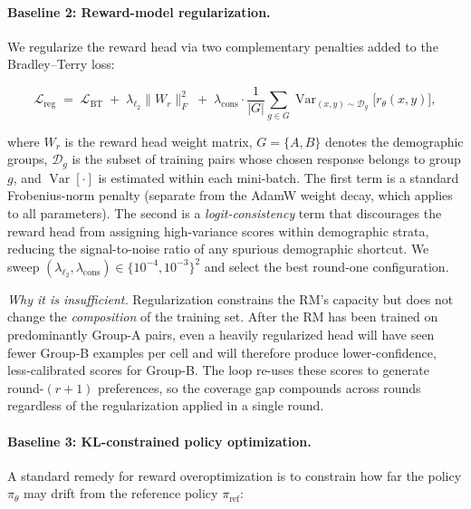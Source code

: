 \paragraph{Baseline 2: Reward-model regularization.}
We regularize the reward head via two complementary penalties added to the
Bradley--Terry loss:

\begin{equation}
    \mathcal{L}_{\mathrm{reg}} \;=\;
    \mathcal{L}_{\mathrm{BT}}
    \;+\; \lambda_{\ell_2} \lVert W_r \rVert_F^2
    \;+\; \lambda_{\mathrm{cons}} \cdot
    \frac{1}{|G|}\sum_{g \in G} \operatorname{Var}_{(x,y)\sim\mathcal{D}_g}
    \bigl[r_\theta(x,y)\bigr],
\label{eq:rm_reg}
\end{equation}

where $W_r$ is the reward head weight matrix, $G = \{A, B\}$ denotes the
demographic groups, $\mathcal{D}_g$ is the subset of training pairs whose
chosen response belongs to group $g$, and $\operatorname{Var}[\cdot]$ is
estimated within each mini-batch.
The first term is a standard Frobenius-norm penalty (separate from the AdamW
weight decay, which applies to all parameters).
The second is a \emph{logit-consistency} term that discourages the reward head
from assigning high-variance scores within demographic strata, reducing the
signal-to-noise ratio of any spurious demographic shortcut.
We sweep $(\lambda_{\ell_2}, \lambda_{\mathrm{cons}}) \in \{10^{-4}, 10^{-3}\}^2$
and select the best round-one configuration.

\emph{Why it is insufficient.}
Regularization constrains the RM's capacity but does not change the
\emph{composition} of the training set.
After the RM has been trained on predominantly Group-A pairs, even a heavily
regularized head will have seen fewer Group-B examples per cell and will
therefore produce lower-confidence, less-calibrated scores for Group-B.
The loop re-uses these scores to generate round-$(r{+}1)$ preferences, so the
coverage gap compounds across rounds regardless of the regularization
applied in a single round.

\paragraph{Baseline 3: KL-constrained policy optimization.}
A standard remedy for reward overoptimization is to constrain how far the
policy $\pi_\theta$ may drift from the reference policy $\pi_{\mathrm{ref}}$:

